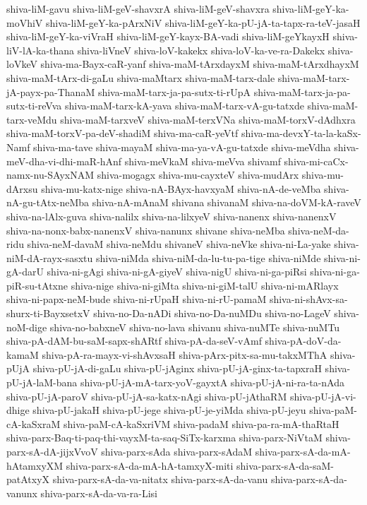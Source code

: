{shiva-liM-gavu
shiva-liM-geV-shavxrA
shiva-liM-geV-shavxra
shiva-liM-geY-ka-moVhiV
shiva-liM-geY-ka-pArxNiV
shiva-liM-geY-ka-pU-jA-ta-tapx-ra-teV-jasaH
shiva-liM-geY-ka-viVraH
shiva-liM-geY-kayx-BA-vadi
shiva-liM-geYkayxH
shiva-liV-lA-ka-thana
shiva-liVneV
shiva-loV-kakekx
shiva-loV-ka-ve-ra-Dakekx
shiva-loVkeV
shiva-ma-Bayx-caR-yanf
shiva-maM-tArxdayxM
shiva-maM-tArxdhayxM
shiva-maM-tArx-di-gaLu
shiva-maMtarx
shiva-maM-tarx-dale
shiva-maM-tarx-jA-payx-pa-ThanaM
shiva-maM-tarx-ja-pa-sutx-ti-rUpA
shiva-maM-tarx-ja-pa-sutx-ti-reVva
shiva-maM-tarx-kA-yava
shiva-maM-tarx-vA-gu-tatxde
shiva-maM-tarx-veMdu
shiva-maM-tarxveV
shiva-maM-terxVNa
shiva-maM-torxV-dAdhxra
shiva-maM-torxV-pa-deV-shadiM
shiva-ma-caR-yeVtf
shiva-ma-devxY-ta-la-kaSx-Namf
shiva-ma-tave
shiva-mayaM
shiva-ma-ya-vA-gu-tatxde
shiva-meVdha
shiva-meV-dha-vi-dhi-maR-hAnf
shiva-meVkaM
shiva-meVva
shivamf
shiva-mi-caCx-namx-nu-SAyxNAM
shiva-mogagx
shiva-mu-cayxteV
shiva-mudArx
shiva-mu-dArxsu
shiva-mu-katx-nige
shiva-nA-BAyx-havxyaM
shiva-nA-de-veMba
shiva-nA-gu-tAtx-neMba
shiva-nA-mAnaM
shivana
shivanaM
shiva-na-doVM-kA-raveV
shiva-na-lAlx-guva
shiva-nalilx
shiva-na-lilxyeV
shiva-nanenx
shiva-nanenxV
shiva-na-nonx-babx-nanenxV
shiva-nanunx
shivane
shiva-neMba
shiva-neM-da-ridu
shiva-neM-davaM
shiva-neMdu
shivaneV
shiva-neVke
shiva-ni-La-yake
shiva-niM-dA-rayx-sasxtu
shiva-niMda
shiva-niM-da-lu-tu-pa-tige
shiva-niMde
shiva-ni-gA-darU
shiva-ni-gAgi
shiva-ni-gA-giyeV
shiva-nigU
shiva-ni-ga-piRsi
shiva-ni-ga-piR-su-tAtxne
shiva-nige
shiva-ni-giMta
shiva-ni-giM-talU
shiva-ni-mARlayx
shiva-ni-papx-neM-bude
shiva-ni-rUpaH
shiva-ni-rU-pamaM
shiva-ni-shAvx-sa-shurx-ti-BayxsetxV
shiva-no-Da-nADi
shiva-no-Da-nuMDu
shiva-no-LageV
shiva-noM-dige
shiva-no-babxneV
shiva-no-lava
shivanu
shiva-nuMTe
shiva-nuMTu
shiva-pA-dAM-bu-saM-sapx-shARtf
shiva-pA-da-seV-vAmf
shiva-pA-doV-da-kamaM
shiva-pA-ra-mayx-vi-shAvxsaH
shiva-pArx-pitx-sa-mu-takxMThA
shiva-pUjA
shiva-pU-jA-di-gaLu
shiva-pU-jAginx
shiva-pU-jA-ginx-ta-tapxraH
shiva-pU-jA-laM-bana
shiva-pU-jA-mA-tarx-yoV-gayxtA
shiva-pU-jA-ni-ra-ta-nAda
shiva-pU-jA-paroV
shiva-pU-jA-sa-katx-nAgi
shiva-pU-jAthaRM
shiva-pU-jA-vi-dhige
shiva-pU-jakaH
shiva-pU-jege
shiva-pU-je-yiMda
shiva-pU-jeyu
shiva-paM-cA-kaSxraM
shiva-paM-cA-kaSxriVM
shiva-padaM
shiva-pa-ra-mA-thaRtaH
shiva-parx-Baq-ti-paq-thi-vayxM-ta-saq-SiTx-karxma
shiva-parx-NiVtaM
shiva-parx-sA-dA-jijxVvoV
shiva-parx-sAda
shiva-parx-sAdaM
shiva-parx-sA-da-mA-hAtamxyXM
shiva-parx-sA-da-mA-hA-tamxyX-miti
shiva-parx-sA-da-saM-patAtxyX
shiva-parx-sA-da-va-nitatx
shiva-parx-sA-da-vanu
shiva-parx-sA-da-vanunx
shiva-parx-sA-da-va-ra-Lisi
}
